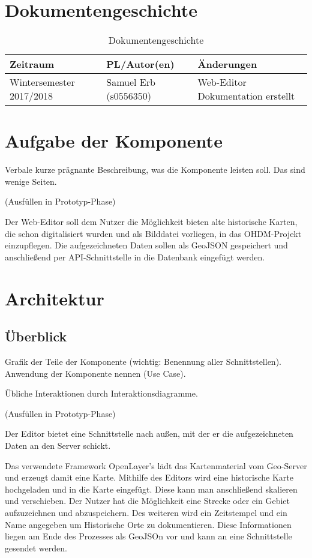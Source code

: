 \documentclass[a4paper, 12.5pt]{scrartcl}
\begin{document}
\section{Dokumentengeschichte}
\begin{table}[h]
    \begin{tabular}{|l|l|p{4cm}|}
        \hline
        Zeitraum & PL/Autor(en) & Änderungen \\
        \hline
        Wintersemester 2017/2018 & Samuel Erb (s0556350) &
        Web-Editor Dokumentation erstellt \newline

        \\
        \hline
    \end{tabular}
    \caption{Dokumentengeschichte}
\end{table}

\section{Aufgabe der Komponente}
Verbale kurze prägnante Beschreibung, was die Komponente leisten soll.
Das sind wenige Seiten.

(Ausfüllen in Prototyp-Phase)

Der Web-Editor soll dem Nutzer die Möglichkeit bieten alte historische Karten, die schon digitalisiert wurden und als Bilddatei vorliegen, in das OHDM-Projekt einzupflegen. Die aufgezeichneten Daten sollen als GeoJSON gespeichert und anschließend per API-Schnittstelle in die Datenbank eingefügt werden.


\section{Architektur}

\subsection{Überblick}
Grafik der Teile der Komponente (wichtig: Benennung aller Schnittstellen).
Anwendung der Komponente nennen (Use Case).

Übliche Interaktionen durch Interaktionsdiagramme.

(Ausfüllen in Prototyp-Phase)


Der Editor bietet eine Schnittstelle nach außen, mit der er die aufgezeichneten Daten an den Server schickt.

Das verwendete Framework OpenLayer’s lädt das Kartenmaterial vom Geo-Server und erzeugt damit eine Karte. Mithilfe des Editors wird eine historische Karte hochgeladen und in die Karte eingefügt. Diese kann man anschließend skalieren und verschieben. Der Nutzer hat die Möglichkeit eine Strecke oder ein Gebiet aufzuzeichnen und abzuspeichern. Des weiteren wird ein Zeitstempel und ein Name angegeben um Historische Orte zu dokumentieren. Diese Informationen liegen am Ende des Prozesses als GeoJSOn vor und kann an eine Schnittstelle gesendet werden.
\end{document}
